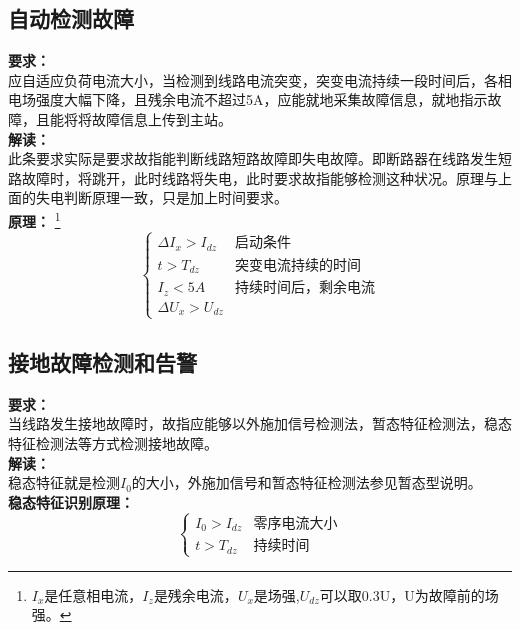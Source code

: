 \documentclass{article}
\begin{document}
\begin{CJK}{UTF8}{gbsn}
\subsection{自动检测故障}
\par
	\textbf{要求：}\\应自适应负荷电流大小，当检测到线路电流突变，突变电流持续一段时间后，各相电场强度大幅下降，且残余电流不超过5A，应能就地采集故障信息，就地指示故障，且能将将故障信息上传到主站。\\
	\textbf{解读：}\\此条要求实际是要求故指能判断线路短路故障即失电故障。即断路器在线路发生短路故障时，将跳开，此时线路将失电，此时要求故指能够检测这种状况。原理与上面的失电判断原理一致，只是加上时间要求。\\
	\textbf{原理：}
	\footnote{$I_x$是任意相电流，$I_z$是残余电流，$U_x$是场强,$U_{dz}$可以取0.3U，U为故障前的场强。}
	\begin{equation}	
		\left\{ \begin{array}{ll}
				\Delta I_x>I_{dz} & \textrm{启动条件}\\
			    t>T_{dz} & \textrm{突变电流持续的时间}\\
				I_z<5A & \textrm{持续时间后，剩余电流}\\ 
			\Delta U_x>U_{dz}
		\end{array}
		\right .
	\end{equation}
\subsection{接地故障检测和告警}
	\par
	\textbf{要求：}\\当线路发生接地故障时，故指应能够以外施加信号检测法，暂态特征检测法，稳态特征检测法等方式检测接地故障。\\
	\textbf{解读：}	\\稳态特征就是检测$I_0$的大小，外施加信号和暂态特征检测法参见暂态型说明。\\
	\textbf{稳态特征识别原理：}\\
	\begin{equation}
		\left\{
			\begin{array}{ll}
				I_0>I_{dz} & \textrm{零序电流大小}\\
				  t>T_{dz} & \textrm{持续时间}
			\end{array}
			\right.
	\end{equation}

\end{CJK}
\end{document}
